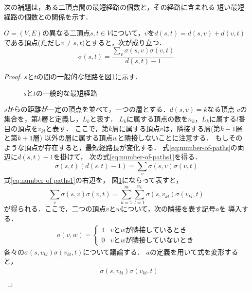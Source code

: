 次の補題は，ある二頂点間の最短経路の個数と，その経路に含まれる
短い最短経路の個数との関係を示す．
\begin{lemma}
  \label{lemma:number-of-paths}
  $G=(V,E)$の異なる二頂点$s,t\in V$について，$v$を$d(s,t)=d(s,v)+d(v,t)$
  である頂点(ただし$v\neq s,t$)とすると，次が成り立つ．
  \begin{equation}
    \label{eq:number-of-paths}
    \sigma(s,t)=\frac{\sum_{v}\sigma(s,v)\sigma(v,t)}{d(s,t)-1}
  \end{equation}
\end{lemma}
\begin{proof}
  $s$と$t$の間の一般的な経路を図\ref{fig:proof-number-of-paths}に示す．
  \begin{figure}
    \centering
    \def\svgwidth{.5\columnwidth}
    
    \caption{$s$と$t$の一般的な最短経路}
    \label{fig:proof-number-of-paths}
  \end{figure}
  $s$からの距離が一定の頂点を並べて，一つの層とする．$d(s,v)=k$なる頂点
  $v$の集合を，第$k$層と定義し，$L_k$と表す．
  $L_k$に属する頂点の数を$n_k$，$L_k$に属する$l$番目の頂点を$v_{kl}$と表す．
  ここで，第$k$層に属する頂点$v$は，隣接する層(第$k-1$層と第$k+1$層)
  以外の層に属する頂点$w$と隣接しないことに注意する．
  もしそのような頂点が存在すると，最短経路長が変化する．
  式\ref{eq:number-of-paths}の両辺に$d(s,t)-1$を掛けて，
  次の式\ref{eq:number-of-paths1}を得る．
  \begin{equation}
    \sigma(s,t)(d(s,t)-1)=\sum_{v}\sigma(s,v)\sigma(v,t)
    \label{eq:number-of-paths1}
  \end{equation}
  式\ref{eq:number-of-paths1}の右辺を，
  図\ref{fig:proof-number-of-paths}にならって表すと，
  \begin{equation}
    \sum_{v}\sigma(s,v)\sigma(v,t)=
    \sum_{k=1}^m\sum_{l=1}^{n_k}\sigma(s,v_{kl})\sigma(v_{kl},t)
    \label{eq:number-of-paths2}
  \end{equation}
  が得られる．ここで，二つの頂点$v$と$w$について，次の隣接を表す記号$a$を
  導入する．
  \begin{align*}
    a(v,w)=
    \begin{cases}
      1 & vとwが隣接しているとき \\
      0 & vとwが隣接していないとき
    \end{cases}
  \end{align*}
  各々の$\sigma(s,v_{kl})\sigma(v_{kl},t)$について議論する．
  $a$の定義を用いて式を変形すると，
  \begin{align}
    &\sigma(s,v_{kl})\sigma(v_{kl},t)\nonumber\\

\end{align}
\end{proof}
